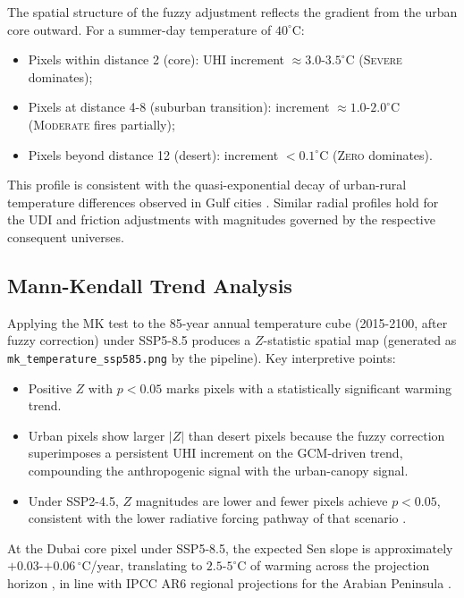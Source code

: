 \documentclass[conference]{IEEEtran}
\begin{document}
The spatial structure of the fuzzy adjustment reflects the gradient from
the urban core outward.  For a summer-day temperature of
\(40^{\circ}\)C:
\begin{itemize}[leftmargin=1.5em]
  \item Pixels within distance 2 (core): UHI increment
    \(\approx 3.0\text{-}3.5^{\circ}\)C (\textsc{Severe} dominates);
  \item Pixels at distance 4-8 (suburban transition): increment
    \(\approx 1.0\text{-}2.0^{\circ}\)C (\textsc{Moderate} fires partially);
  \item Pixels beyond distance 12 (desert): increment
    \(<\!0.1^{\circ}\)C (\textsc{Zero} dominates).
\end{itemize}
This profile is consistent with the quasi-exponential decay of urban-rural
temperature differences observed in Gulf cities
\cite{globalmapuhi2018,radhi2013uae}.  Similar radial profiles hold for
the UDI and friction adjustments with magnitudes governed by the
respective consequent universes.

\subsection{Mann-Kendall Trend Analysis}

Applying the MK test to the 85-year annual temperature cube
(2015-2100, after fuzzy correction) under SSP5-8.5 produces a
\(Z\)-statistic spatial map (generated as
\texttt{mk\_temperature\_ssp585.png} by the pipeline).
Key interpretive points:
\begin{itemize}[leftmargin=1.5em]
  \item Positive \(Z\) with \(p<0.05\) marks pixels with a statistically
    significant warming trend.
  \item Urban pixels show larger \(|Z|\) than desert pixels because the
    fuzzy correction superimposes a persistent UHI increment on the
    GCM-driven trend, compounding the anthropogenic signal with the
    urban-canopy signal.
  \item Under SSP2-4.5, \(Z\) magnitudes are lower and fewer pixels
    achieve \(p<0.05\), consistent with the lower radiative forcing
    pathway of that scenario \cite{ipcc2021ar6}.
\end{itemize}
At the Dubai core pixel under SSP5-8.5, the expected Sen slope is
approximately \(+0.03\)-\(+0.06\,^{\circ}\)C/year, translating to
\(2.5\)-\(5^{\circ}\)C of warming across the projection horizon ,  in
line with IPCC AR6 regional projections for the Arabian Peninsula
\cite{ipcc2021ar6,almazroui2020warming}.
\end{document}
